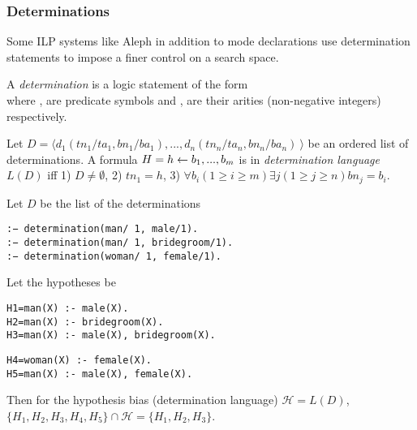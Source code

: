 \subsubsection{Determinations}
Some ILP systems like Aleph in addition to mode declarations use determination statements\cite{aleph2007} to impose a finer control on a search space.

\begin{defn}\cite{aleph2007}
A \emph{determination} is a logic statement of the form\\
where ,  are predicate symbols and
,  are their arities (non-negative integers) respectively.
\end{defn}

\begin{defn}\label{definition_determination_language}
Let $D=\langle d_1(tn_1/ta_1, bn_1/ba_1), ..., d_n(tn_n/ta_n, bn_n/ba_n)\ \rangle$ be an ordered list of determinations. A formula $H=h \leftarrow b_1, ..., b_m$ is in \emph{determination language} $L(D)$ iff
1) $D \not=\emptyset$, 2) $tn_1=h$, 3) $\forall b_i (1 \ge i \ge m) \exists j (1 \ge j \ge n) bn_j=b_i$.
\end{defn}

\begin{exmp}
Let $D$ be the list of the determinations
\begin{lstlisting}
:− determination(man/ 1, male/1).
:− determination(man/ 1, bridegroom/1).
:− determination(woman/ 1, female/1).
\end{lstlisting}
Let the hypotheses be

\begin{minipage}[t]{.50\textwidth}
\begin{lstlisting}
H1=man(X) :- male(X).
H2=man(X) :- bridegroom(X).
H3=man(X) :- male(X), bridegroom(X).
\end{lstlisting}
\end{minipage}
\begin{minipage}[t]{.50\textwidth}
\begin{lstlisting}
H4=woman(X) :- female(X).
H5=man(X) :- male(X), female(X).
\end{lstlisting}
\end{minipage}

Then for the hypothesis bias (determination language) $\mathcal{H}=L(D)$,
$\{H_1, H_2, H_3, H_4, H_5\} \cap \mathcal{H}=\{H_1, H_2, H_3\}$.
\end{exmp}


